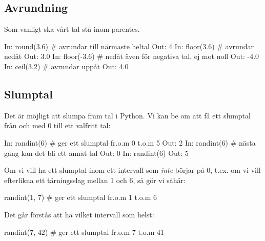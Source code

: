 \subsection{Avrundning}

Som vanligt ska vårt tal stå inom parentes.

\begin{python}[caption={Avrundning},label={}]
In: round(3.6) # avrundar till närmaste heltal
Out: 4
In: floor(3.6) # avrundar nedåt
Out: 3.0
In: floor(-3.6) # nedåt även för negativa tal. ej mot noll
Out: -4.0
In: ceil(3.2) # avrundar uppåt
Out: 4.0
\end{python}

\subsection{Slumptal}\label{subsec:randint}
Det är möjligt att slumpa fram tal i Python. Vi kan be om att få ett slumptal från och med 0 till ett valfritt tal:

\begin{python}[caption={Slumptal},label={}]
In: randint(6) # ger ett slumptal fr.o.m 0 t.o.m 5
Out: 2
In: randint(6) # nästa gång kan det bli ett annat tal
Out: 0
In: randint(6)
Out: 5
\end{python}


Om vi vill ha ett slumptal inom ett intervall som \emph{inte} börjar på 0, t.ex. om vi vill efterlikna ett tärningsslag mellan 1 och 6, så gör vi såhär:

\vspace{10pt}
\begin{python}
randint(1, 7) # ger ett slumptal fr.o.m 1 t.o.m 6
\end{python}

Det går förstås att ha vilket intervall som helst:
\vspace{10pt}
\begin{python}
randint(7, 42) # ger ett slumptal fr.o.m 7 t.o.m 41
\end{python}


